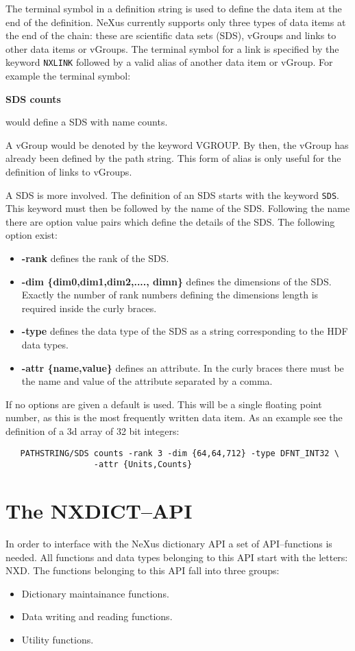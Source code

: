 \documentclass[12pt]{article}
\begin{document}
 The terminal symbol in a definition string is used to define the data item
 at the end of the definition. NeXus currently supports only three types of
 data items at the end of the chain: these are scientific data sets (SDS),
 vGroups and links to other data items or vGroups. The terminal symbol for a link
 is specified by the keyword \verb+NXLINK+  
 followed
 by a valid alias of another data item or vGroup. For example the terminal 
 symbol: \\
 \centerline{\bf SDS counts}
 would define a SDS with name counts.

 A vGroup would be denoted by the keyword VGROUP. By then, the vGroup has
 already been defined by the path string. This form of alias is only useful
 for the definition of links to vGroups.

 A SDS is more involved. The definition of an SDS starts with the keyword
 \verb+SDS+. This keyword must then be followed by the name of the SDS.
 Following the name there are option value pairs which define the 
  details of the SDS. The following option exist:
 \begin{itemize}
  \item {\bf -rank} defines the rank of the SDS.
  \item {\bf -dim \{dim0,dim1,dim2,...., dimn\} } defines the dimensions of the
       SDS. Exactly the number of rank numbers defining the dimensions
 length is required inside the curly braces. 
  \item {\bf -type} defines the data type of the SDS as a string corresponding
  to the HDF data types.
  \item {\bf -attr \{name,value\} } defines an attribute. In the curly braces
   there must be the name and value of the attribute separated by a comma.
  \end{itemize}
  If no options are given a default is used. This will be a single floating
  point number, as this is the most frequently written data item. As an 
  example see the definition of a 3d array of 32 bit integers:
  \begin{verbatim}
   PATHSTRING/SDS counts -rank 3 -dim {64,64,712} -type DFNT_INT32 \
                  -attr {Units,Counts}      

  \end{verbatim}

  \section{The NXDICT--API}
  In order to interface with the NeXus dictionary API a set of
  API--functions is needed. All functions and data types belonging to
  this API start with the letters: NXD. The functions belonging to this API
  fall into three groups:
  \begin{itemize}
   \item Dictionary maintainance functions.
   \item Data writing and reading functions.
   \item Utility functions.
  \end{itemize}
  
\end{document}
